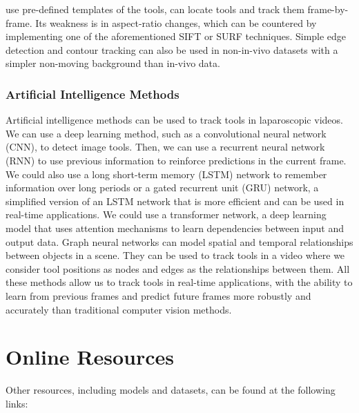 use pre-defined templates of the tools, can locate tools and track them frame-by-frame. Its weakness is in aspect-ratio changes, which can be countered by implementing one of the aforementioned SIFT or SURF techniques. Simple edge detection and contour tracking can also be used in non-in-vivo datasets with a simpler non-moving background than in-vivo data.

\subsubsection{Artificial Intelligence Methods}

Artificial intelligence methods can be used to track tools in laparoscopic videos. We can use a deep learning method, such as a convolutional neural network (CNN), to detect image tools. Then, we can use a recurrent neural network (RNN) to use previous information to reinforce predictions in the current frame. We could also use a long short-term memory (LSTM) network to remember information over long periods or a gated recurrent unit (GRU) network, a simplified version of an LSTM network that is more efficient and can be used in real-time applications. We could use a transformer network, a deep learning model that uses attention mechanisms to learn dependencies between input and output data. Graph neural networks can model spatial and temporal relationships between objects in a scene. They can be used to track tools in a video where we consider tool positions as nodes and edges as the relationships between them. All these methods allow us to track tools in real-time applications, with the ability to learn from previous frames and predict future frames more robustly and accurately than traditional computer vision methods.

\section{Online Resources}

Other resources, including models and datasets, can be found at the following links:

